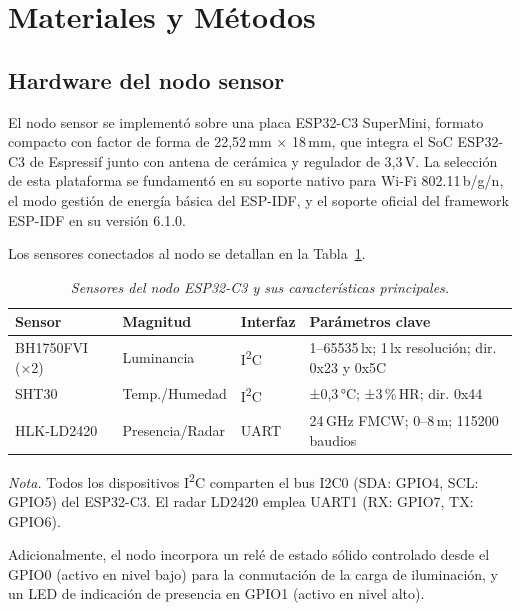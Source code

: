 
\section{Materiales y Métodos}
\label{sec:materiales}

\subsection{Hardware del nodo sensor}

El nodo sensor se implementó sobre una placa ESP32-C3 SuperMini, formato compacto
con factor de forma de 22,52\,mm × 18\,mm, que integra el SoC ESP32-C3 de Espressif
junto con antena de cerámica y regulador de 3,3\,V. La selección de esta plataforma
se fundamentó en su soporte nativo para Wi-Fi 802.11\,b/g/n, el modo
gestión de energía básica del ESP-IDF, y el soporte
oficial del framework ESP-IDF en su versión 6.1.0.

Los sensores conectados al nodo se detallan en la Tabla~\ref{tab:sensores}.

\begin{table}[htbp]
  \caption{\textit{Sensores del nodo ESP32-C3 y sus características principales.}}
  \label{tab:sensores}
  \centering
  \small
  \begin{tabularx}{\textwidth}{@{}lllX@{}}
    \toprule
    \textbf{Sensor} & \textbf{Magnitud} & \textbf{Interfaz} & \textbf{Parámetros clave} \\
    \midrule
    BH1750FVI (×2) & Luminancia & I\textsuperscript{2}C & 1–65535\,lx; 1\,lx resolución; dir. 0x23 y 0x5C \\
    SHT30 & Temp./Humedad & I\textsuperscript{2}C & ±0,3\,°C; ±3\,\%\,HR; dir. 0x44 \\
    HLK-LD2420 & Presencia/Radar & UART & 24\,GHz FMCW; 0–8\,m; 115200 baudios \\
    \bottomrule
  \end{tabularx}
  \vspace{4pt}

  \noindent\textit{Nota.} Todos los dispositivos I\textsuperscript{2}C comparten el bus I2C0
  (SDA: GPIO4, SCL: GPIO5) del ESP32-C3. El radar LD2420 emplea UART1 (RX: GPIO7, TX: GPIO6).
\end{table}

Adicionalmente, el nodo incorpora un relé de estado sólido controlado desde el
GPIO0 (activo en nivel bajo) para la conmutación de la carga de iluminación, y un
LED de indicación de presencia en GPIO1 (activo en nivel alto).

